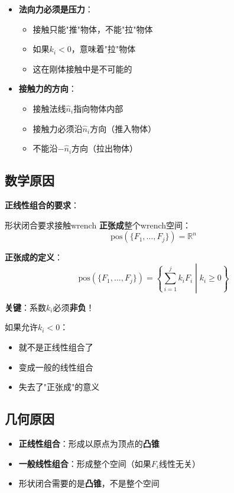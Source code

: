 \documentclass[12pt,a4paper]{article}
\begin{document}
\begin{itemize}
\item \textbf{法向力必须是压力}：
   \begin{itemize}
   \item 接触只能"推"物体，不能"拉"物体
   \item 如果$k_i < 0$，意味着"拉"物体
   \item 这在刚体接触中是不可能的
   \end{itemize}

\item \textbf{接触力的方向}：
   \begin{itemize}
   \item 接触法线$\hat{n}_i$指向物体内部
   \item 接触力必须沿$\hat{n}_i$方向（推入物体）
   \item 不能沿$-\hat{n}_i$方向（拉出物体）
   \end{itemize}
\end{itemize}

\subsection{数学原因}

\textbf{正线性组合的要求}：

形状闭合要求接触wrench \textbf{正张成}整个wrench空间：
\begin{equation}
\text{pos}(\{F_1, \ldots, F_j\}) = \mathbb{R}^n
\end{equation}

\textbf{正张成的定义}：
\begin{equation}
\text{pos}(\{F_1, \ldots, F_j\}) = \left\{\sum_{i=1}^j k_i F_i \middle| k_i \geq 0\right\}
\end{equation}

\textbf{关键}：系数$k_i$必须\textbf{非负}！

如果允许$k_i < 0$：
\begin{itemize}
\item 就不是正线性组合了
\item 变成一般的线性组合
\item 失去了"正张成"的意义
\end{itemize}

\subsection{几何原因}

\begin{itemize}
\item \textbf{正线性组合}：形成以原点为顶点的\textbf{凸锥}
\item \textbf{一般线性组合}：形成整个空间（如果$F_i$线性无关）
\item 形状闭合需要的是\textbf{凸锥}，不是整个空间
\end{itemize}
\end{document}
